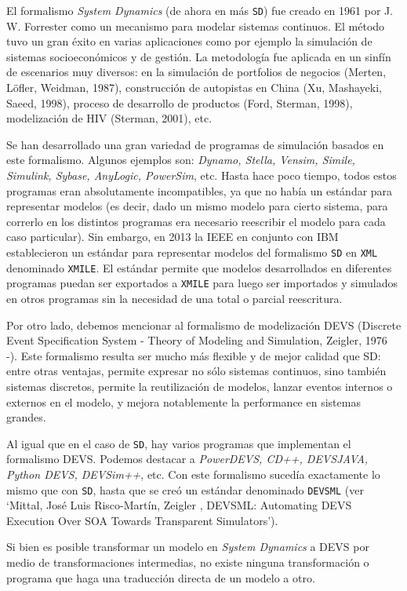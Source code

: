 
El formalismo \textit{System Dynamics} (de ahora en más \texttt{SD}) fue creado en 1961 por J. W.
Forrester como un mecanismo para modelar sistemas continuos. El método tuvo un
gran éxito en varias aplicaciones como por ejemplo la simulación de sistemas
socioeconómicos y de gestión. La metodología fue aplicada en un sinfín de
escenarios muy diversos: en la simulación de portfolios de negocios (Merten,
Löfler, Weidman, 1987), construcción de autopistas en China (Xu, Mashayeki,
Saeed, 1998), proceso de desarrollo de productos (Ford, Sterman, 1998),
modelización de HIV (Sterman, 2001), etc.


Se han desarrollado una gran variedad de programas de simulación basados en este formalismo. Algunos ejemplos son: \textit{Dynamo, Stella, Vensim, Simile, Simulink, Sybase, AnyLogic, PowerSim}, etc. Hasta hace poco tiempo, todos estos programas eran absolutamente incompatibles, ya que no había un estándar para representar modelos (es decir, dado un mismo modelo para cierto sistema, para correrlo en los distintos programas era necesario reescribir el modelo para cada caso particular). Sin embargo, en 2013 la IEEE en conjunto con IBM establecieron un estándar para representar modelos del formalismo \texttt{SD} en \texttt{XML} denominado \texttt{XMILE}. El estándar permite que modelos desarrollados en diferentes programas puedan ser exportados a \texttt{XMILE} para luego ser importados y simulados en otros programas sin la necesidad de una total o parcial reescritura.

Por otro lado, debemos mencionar al formalismo de modelización DEVS (Discrete Event Specification System - Theory of Modeling and Simulation, Zeigler, 1976 -). Este formalismo resulta ser mucho más flexible y de mejor calidad que SD: entre otras ventajas, permite expresar no sólo sistemas continuos, sino también sistemas discretos, permite la reutilización de modelos, lanzar eventos internos o externos en el modelo, y mejora notablemente la performance en sistemas grandes.

Al igual que en el caso de \texttt{SD}, hay varios programas que implementan el formalismo DEVS. Podemos destacar a \textit{PowerDEVS, CD++, DEVSJAVA, Python DEVS,  DEVSim++}, etc. Con este formalismo sucedía exactamente lo mismo que con \texttt{SD}, hasta que se creó un estándar denominado \texttt{DEVSML} (ver ‘Mittal, José Luis Risco-Martín, Zeigler , DEVSML: Automating DEVS Execution Over SOA Towards Transparent Simulators’).

Si bien es posible transformar un modelo en \textit{System Dynamics} a DEVS por medio de transformaciones intermedias, no existe ninguna transformación o programa que haga una traducción directa de un modelo a otro. 

